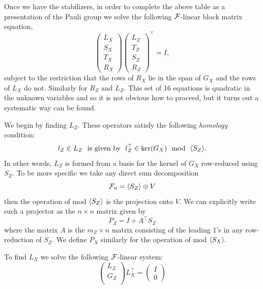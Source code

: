 Once we have the stabilizers, in order to
complete the above table as a presentation
of the Pauli group we solve the
following $\mathcal{F}$-linear block matrix equation,
$$
\left( \begin{array}{l}
L_X\\
S_X\\
T_X\\
R_X
\end{array} \right)
\left( \begin{array}{l}
L_Z\\
T_Z\\
S_Z\\
R_Z
\end{array} \right)^\top =
I,
$$
subject to the restriction that the rows of
$R_X$ lie in the span of $G_X$ and
the rows of $L_X$ do not.
Similarly for $R_Z$ and $L_Z.$
This set of 16 equations is quadratic in the unknown variables
and so it is not obvious how to proceed, but it turns out a
systematic way can be found.

We begin by finding $L_Z.$
These operators satisfy the following \emph{homology} condition:
$$
    l_Z \in L_Z \ \ \mbox{is given by}\ \  l_Z^\top \in \mathrm{ker}(G_X) \ \ \mbox{mod}\ \  \langle S_Z \rangle.
$$
In other words, $L_Z$ is formed from a basis for the kernel of $G_X$ 
row-reduced using $S_Z.$
To be more specific %
we take any direct sum decomposition
$$\mathcal{F}_{n} = \langle S_Z \rangle \oplus V$$
then the operation of mod $\langle S_Z \rangle$ is the
projection onto $V.$
We can explicitly write such a 
projector as the $n\times n$
matrix given by
$$
    P_Z = I + A^\top S_Z
$$
where the matrix $A$ is the $m_Z\times n$ matrix consisting of
the leading 1's in any row-reduction of $S_Z.$
We define $P_X$ similarly for the operation of mod $\langle S_X \rangle.$

To find $L_X$ we solve the following $\mathcal{F}$-linear
system:
$$
\left( \begin{array}{l}
L_Z\\
G_Z\\
\end{array} \right)
L_X^\top = 
\left( \begin{array}{l}
I\\
0
\end{array} \right)
$$

